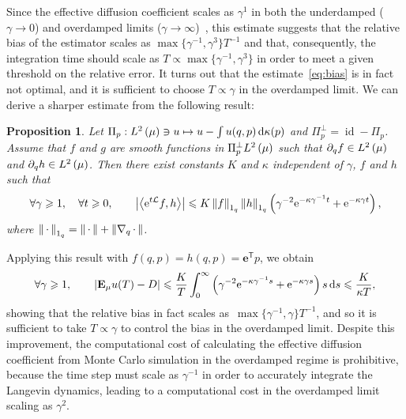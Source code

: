 \documentclass[11pt,a4paper]{article}
\DeclareMathOperator{\id}{id}
\newcommand{\e}{\mathrm{e}}
\newcommand{\dummy}{\,\cdot\,}
\newcommand{\expect}[0]{\mathbf{E}}
\newcommand{\grad}{\nabla}
\newcommand{\vect}[1]{\boldsymbol{\mathbf #1}}
\renewcommand{\d}{\mathrm d}
\renewcommand{\t}{\mathsf T}
\theoremstyle{plain}
\newtheorem{proposition}{Proposition}[section]
\numberwithin{equation}{section}
\renewcommand{\leq}{\leqslant}
\renewcommand{\geq}{\geqslant}
\begin{document}
Since the effective diffusion coefficient scales as $\gamma^1$ in both the underdamped ($\gamma \to 0$) and overdamped limits ($\gamma \to \infty$)~\cite{MR2394704,MR2427108},
this estimate suggests that the relative bias of the estimator scales as $\max\{\gamma^{-1}, \gamma^3\} T^{-1}$ and that,
consequently, the integration time should scale as $T \propto \max\{\gamma^{-1}, \gamma^3\}$ in order to meet a given threshold on the relative error.
It turns out that the estimate~\eqref{eq:bias} is in fact not optimal,
and it is sufficient to choose $T \propto \gamma$ in the overdamped limit.
We can derive a sharper estimate from the following result:
\begin{proposition}
    \label{proposition:semigroup_meanzero_observable}
    Let $\Pi_p: \lp{2}{\mu} \ni u \mapsto  u - \int u(q, p) \, \d \kappa(p)$ and $\Pi_p^\perp = \id - \Pi_p$.
    Assume that $f$ and $g$ are smooth functions in $\Pi_p^\perp \lp{2}{\mu}$
    such that $\partial_q f \in \lp{2}{\mu}$ and $\partial_q h \in \lp{2}{\mu}$.
    Then there exist constants $K$ and $\kappa$ independent of $\gamma$, $f$ and $h$ such that
    \begin{equation}
        \label{eq:optimal_decay_correlation}
        \forall \gamma \geq 1, \quad
        \forall t \geq 0, \qquad
        \abs{\ip{\e^{t \mathcal L}f}{h}}
        \leq K \norm{f}[1_q]  \norm{h}[1_q] \left( \gamma^{-2} \e^{- \kappa \gamma^{-1} t} + \e^{-\kappa  \gamma t} \right),
    \end{equation}
    where $\norm{\dummy}[1_q] = \norm{\dummy} + \norm{\grad_q \dummy}$.
\end{proposition}
Applying this result with $f(q, p) = h(q, p) = \vect e^\t p$, we obtain
\begin{equation*}
    \forall \gamma \geq 1, \qquad
    \abs{\expect_{\mu} u(T) - D}
    \leq \frac{K}{T}\int_{0}^{\infty} \left( \gamma^{-2} \e^{- \kappa \gamma^{-1} s} + \e^{-\kappa  \gamma s} \right)  s \, \d s
    \leq \frac{K}{\kappa T},
\end{equation*}
showing that the relative bias in fact scales as~$\max\{\gamma^{-1}, \gamma\} T^{-1}$,
and so it is sufficient to take $T \propto \gamma$ to control the bias in the overdamped limit.
Despite this improvement,
the computational cost of calculating the effective diffusion coefficient from Monte Carlo simulation in the overdamped regime is prohibitive,
because the time step must scale as $\gamma^{-1}$ in order to accurately integrate the Langevin dynamics,
leading to a computational cost in the overdamped limit scaling as $\gamma^2$.
\end{document}

